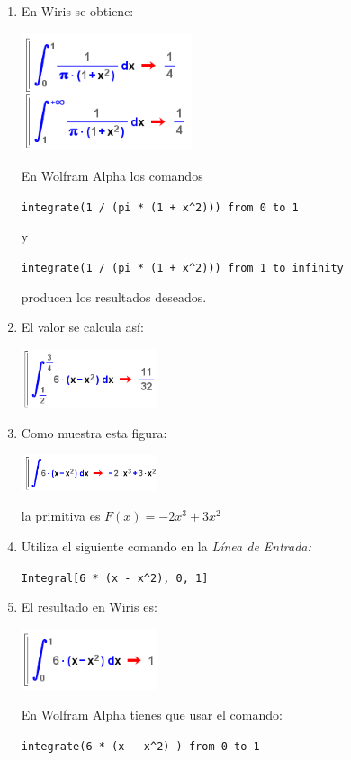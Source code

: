 \documentclass[10pt,a4paper]{article}\usepackage[]{graphicx}\usepackage[]{color}
\begin{document}
\begin{enumerate}
  \item En Wiris se obtiene:
    \begin{center}
        \includegraphics[width=5cm]{../fig/Tut05-52.png}
    \end{center}
  En Wolfram Alpha los comandos
  \begin{center}
    \verb#integrate(1 / (pi * (1 + x^2))) from 0 to 1#
  \end{center}
  y
  \begin{center}
    \verb#integrate(1 / (pi * (1 + x^2))) from 1 to infinity#
  \end{center}
  producen los resultados deseados.

  \item El valor se calcula así:
    \begin{center}
        \includegraphics[width=4cm]{../fig/Tut05-55.png}
    \end{center}

  \item  Como muestra esta figura:
    \begin{center}
        \includegraphics[width=4cm]{../fig/Tut05-54.png}
    \end{center}
    la primitiva es $F(x)= - 2 x^3 + 3 x^2$

  \item Utiliza el siguiente comando en la {\em Línea de Entrada:}
    \begin{center}
      \verb#Integral[6 * (x - x^2), 0, 1]#
    \end{center}

  \item El resultado en Wiris es:
    \begin{center}
        \includegraphics[width=4cm]{../fig/Tut05-53.png}
    \end{center}
    En Wolfram Alpha tienes que usar el comando:
    \begin{center}
        \verb#integrate(6 * (x - x^2) ) from 0 to 1#
    \end{center}

\end{enumerate}
\end{document}
